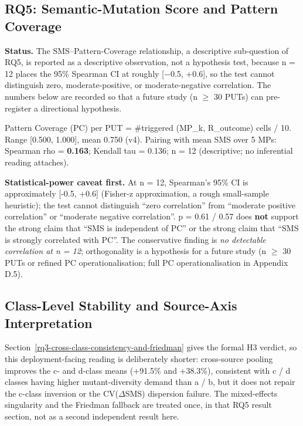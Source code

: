 \documentclass[manuscript,screen,review]{acmart}
\begin{document}
\subsection{RQ5: Semantic-Mutation Score and Pattern Coverage}\label{rq4-sms-vs-pattern-coverage}

\textbf{Status.} The SMS--Pattern-Coverage relationship, a descriptive
sub-question of RQ5, is reported as a descriptive observation, not a
hypothesis test, because n = 12 places the 95\% Spearman CI at roughly
{[}$-$0.5, +0.6{]}, so the test cannot distinguish zero,
moderate-positive, or moderate-negative correlation. The numbers below
are recorded so that a future study (n $\geq$ 30 PUTs) can pre-register a directional
hypothesis.

Pattern Coverage (PC) per PUT = \#triggered (MP\_k, R\_outcome) cells /
10. Range {[}0.500, 1.000{]}, mean 0.750 (v4). Pairing with mean SMS over 5
MPs: Spearman rho = \textbf{0.163}; Kendall tau = 0.136; n = 12
(descriptive; no inferential reading attaches).

\textbf{Statistical-power caveat first.} At n = 12, Spearman's 95\% CI
is approximately {[}-0.5, +0.6{]} (Fisher-z approximation, a rough
small-sample heuristic); the test cannot distinguish ``zero
correlation'' from ``moderate positive correlation'' or ``moderate
negative correlation''. p = 0.61 / 0.57 does \textbf{not} support the
strong claim that ``SMS is independent of PC'' or the strong claim that
``SMS is strongly correlated with PC''. The conservative finding is
\emph{no detectable correlation at n = 12}; orthogonality is a
hypothesis for a future study (n $\geq$ 30 PUTs or refined PC operationalisation; full PC
operationalisation in Appendix D.5).

\subsection{Class-Level Stability and Source-Axis Interpretation}\label{h4-partial-across-same-source-and-cross-source}

Section~\ref{rq3-cross-class-consistency-and-friedman} gives the formal
H3 verdict, so this deployment-facing reading is deliberately shorter:
cross-source pooling improves the c- and d-class means (+91.5\% and
+38.3\%), consistent with c / d classes having higher mutant-diversity
demand than a / b, but it does not repair the c-class inversion or the
CV($\Delta$SMS) dispersion failure. The mixed-effects singularity and the
Friedman fallback are treated once, in that RQ5 result section, not as a
second independent result here.
\end{document}
